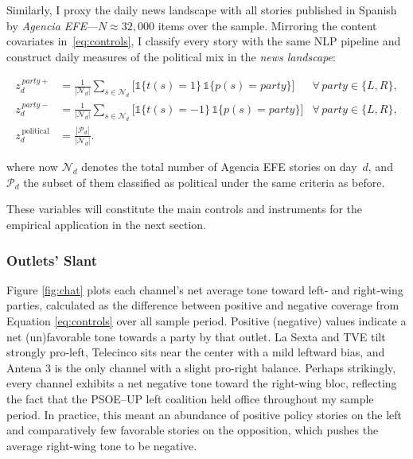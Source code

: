 \documentclass[12pt]{article}
\begin{document}
	Similarly, I proxy the daily news landscape with all stories published in Spanish by \emph{Agencia EFE}—$N\approx32{,}000$ items over the sample. Mirroring the content covariates in~\eqref{eq:controls}, I classify every  story with the same NLP pipeline and construct daily measures of the political mix in the \emph{news landscape}:
	
	\begin{equation}\label{eq:efe}
		\begin{aligned}
			z_d^{\,party+} &= \frac{1}{|\mathcal{N}_d|}\sum_{s\in \mathcal{N}_d}
			\bigl[\mathds{1}\{t(s)=1\}\,\mathds{1}\{p(s)=\textit{party}\}\bigr]
			&\forall\,\textit{party}\in\{L,R\},\\
			z_d^{\,party-} &= \frac{1}{|\mathcal{N}_d|}\sum_{s\in \mathcal{N}_d}
			\bigl[\mathds{1}\{t(s)=-1\}\,\mathds{1}\{p(s)=\textit{party}\}\bigr]
			&\forall\,\textit{party}\in\{L,R\},\\
			z_d^{\,\text{political}} &= \frac{|\mathcal{P}_d|}{|\mathcal{N}_d|}.
		\end{aligned}
	\end{equation}
	
	where now \(\mathcal{N}_d\) denotes the total number of Agencia EFE stories on day~\(d\), and \(\mathcal{P}_d\) the subset of them classified as political under the same criteria as before.
	
	
	
		These variables will constitute the main controls and instruments for the empirical application in the next section. 
	

		\subsubsection*{Outlets' Slant}
	
	
	
	Figure \ref{fig:chat} plots each channel’s net average tone toward left‐ and right‐wing parties, calculated as the difference between positive and negative coverage from Equation \ref{eq:controls} over all sample period. Positive (negative) values indicate a net (un)favorable tone towards a party by that outlet. La Sexta and TVE tilt strongly pro-left, Telecinco sits near the center with a mild leftward bias, and Antena 3 is the only channel  with a slight pro-right balance. Perhaps strikingly, every channel exhibits a net negative tone toward the right-wing bloc, reflecting the fact that the PSOE–UP left coalition held office throughout my sample period. In practice, this meant an abundance of positive policy stories on the left and comparatively few favorable stories on the opposition, which pushes the average right-wing tone to be negative. 
	
\end{document}
